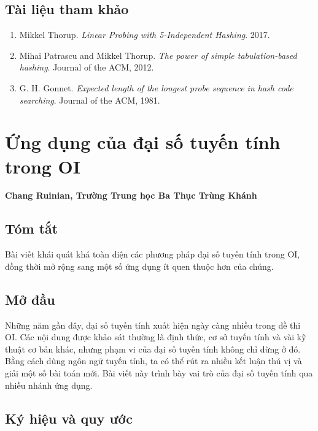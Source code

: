 \documentclass[11pt]{article}
\begin{document}
\subsection*{Tài liệu tham khảo}

\begin{enumerate}
  \item Mikkel Thorup. \emph{Linear Probing with 5-Independent Hashing}. 2017.
  \item Mihai Patrascu and Mikkel Thorup. \emph{The power of simple
  tabulation-based hashing}. Journal of the ACM, 2012.
  \item G. H. Gonnet. \emph{Expected length of the longest probe sequence in
  hash code searching}. Journal of the ACM, 1981.
\end{enumerate}

\section{Ứng dụng của đại số tuyến tính trong OI}

\begin{center}
\textbf{Chang Ruinian, Trường Trung học Ba Thục Trùng Khánh}
\end{center}

\subsection*{Tóm tắt}

Bài viết khái quát khá toàn diện các phương pháp đại số tuyến tính trong OI,
đồng thời mở rộng sang một số ứng dụng ít quen thuộc hơn của chúng.

\subsection{Mở đầu}

Những năm gần đây, đại số tuyến tính xuất hiện ngày càng nhiều trong đề thi OI.
Các nội dung được khảo sát thường là định thức, cơ sở tuyến tính và vài kỹ thuật
cơ bản khác, nhưng phạm vi của đại số tuyến tính không chỉ dừng ở đó. Bằng cách
dùng ngôn ngữ tuyến tính, ta có thể rút ra nhiều kết luận thú vị và giải một số
bài toán mới. Bài viết này trình bày vai trò của đại số tuyến tính qua nhiều
nhánh ứng dụng.

\subsection{Ký hiệu và quy ước}
\end{document}
